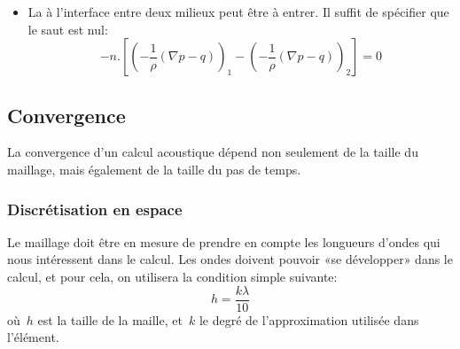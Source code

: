 {\begin{itemize}
Si l'on ne peut pas découpler les équations de chaque milieu (c'est parfois possible et ça vaut donc le coût d'essayer), alors on essaye généralement de procéder par la méthode dite «décalée»: chaque physique est traitée séparément, et l'on essaye ensuite de faire transiter l'information d'un code à l'autre, ce qui n'est pas toujours simple, engendre des erreurs numériques supplémentaires, et surtout nécessite de développer des algorithmes de couplage. Sinon, la méthode dite «monolithique» est théoriquement la plus optimale puisque le fluide et la structure sont traités par un même code de calcul. Toutefois, lorsque les géométries ou la physique du problème à traiter deviennent complexes ce type de méthode n'est plus envisageable puisque chaque milieu (fluide ou solide) nécessite des procédures de calcul numérique spécifiques.
Notons que certains codes de calcul gèrent de manière assez simple pour l'utilisateur ce couplage entre différentes physiques.

   \item La  à l'interface entre deux milieux peut être à entrer. Il suffit de spécifier que le saut est nul:
   \begin{equation}
   -n.\left[\left(-\dfrac1{\rho}(\nabla p-q)\right)_1 - \left(-\dfrac1{\rho}(\nabla p-q)\right)_2\right] =0
   \end{equation}
\end{itemize}



\medskip
\subsection{Convergence}

La convergence d'un calcul acoustique dépend non seulement de la taille du maillage, mais également de la taille du pas de temps.

\medskip
\subsubsection{Discrétisation en espace}
Le maillage doit être en mesure de prendre en compte les longueurs d'ondes qui nous intéressent dans le calcul. Les ondes doivent pouvoir «se développer» dans le calcul, et pour cela, on utilisera la condition simple suivante:
\begin{equation}
h=\dfrac{k\lambda}{10}
\end{equation}
où~$h$ est la taille de la maille, et~$k$ le degré de l'approximation utilisée dans l'élément.

}
